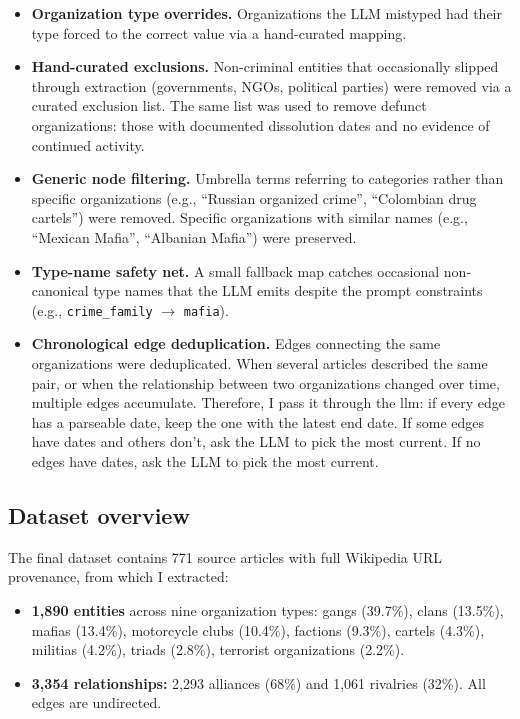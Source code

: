 \documentclass[11pt,a4paper]{article}
\begin{document}
\begin{itemize}[leftmargin=2em]
  \item \textbf{Organization type overrides.} Organizations the LLM mistyped had their type forced to the correct value via a hand-curated mapping.
  \item \textbf{Hand-curated exclusions.} Non-criminal entities that occasionally slipped through extraction (governments, NGOs, political parties) were removed via a curated exclusion list. The same list was used to remove defunct organizations: those with documented dissolution dates and no evidence of continued activity.
  \item \textbf{Generic node filtering.} Umbrella terms referring to categories rather than specific organizations (e.g., ``Russian organized crime'', ``Colombian drug cartels'') were removed. Specific organizations with similar names (e.g., ``Mexican Mafia'', ``Albanian Mafia'') were preserved.
  \item \textbf{Type-name safety net.} A small fallback map catches occasional non-canonical type names that the LLM emits despite the prompt constraints (e.g., \texttt{crime\_family} $\rightarrow$ \texttt{mafia}). 
   \item \textbf{Chronological edge deduplication.} Edges connecting the same organizations were deduplicated. When several articles described the same pair, or when the relationship between two organizations changed over time, multiple edges accumulate. Therefore, I pass it through the llm: if every edge has a parseable date, keep the one with the latest end date. If some edges have dates and others don't, ask the LLM to pick the most current. If no edges have dates, ask the LLM to pick the most current.
\end{itemize}

\subsection{Dataset overview}

The final dataset contains 771 source articles with full Wikipedia URL provenance, from which I extracted:

\begin{itemize}[leftmargin=2em]
  \item \textbf{1{,}890 entities} across nine organization types: gangs (39.7\%), clans (13.5\%), mafias (13.4\%), motorcycle clubs (10.4\%), factions (9.3\%), cartels (4.3\%), militias (4.2\%), triads (2.8\%), terrorist organizations (2.2\%).
  \item \textbf{3{,}354 relationships:} 2{,}293 alliances (68\%) and 1{,}061 rivalries (32\%). All edges are undirected.
\end{itemize}
\end{document}
